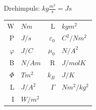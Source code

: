 \documentclass[12pt,a4paper]{article}
\renewcommand{\=}[1]{\stackrel{#1}{=}}
\theoremstyle{definition}
\theoremstyle{remark}
\begin{document}
Drehimpuls: $kg \frac{m^2}{s} = Js$\\
\begin{tabular}{r|l||r|l}
W & $Nm$ & L & $kgm^2$\\
P & $J/s$ & $\varepsilon_0$ & $C^2/Nm^2$\\
$\varphi$ & $J/C$ & $\mu_0$ & $N/A^2$\\
B & $N/Am$ & R & $J/mol K$\\
$\Phi$ & $Tm^2$ & $k_B$ & $J/K$\\
L & $J/A^2$ & $\Gamma$ & $Nm^2/kg^2$\\
I & $W/m^2$ & &
\end{tabular}
\end{document}

